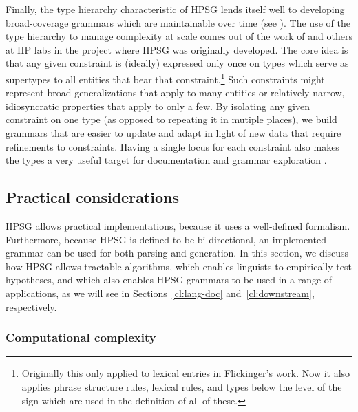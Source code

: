 \documentclass[output=paper,nonflat]{langsci/langscibook}
\begin{document}
Finally, the type hierarchy characteristic of HPSG lends itself well to developing broad-coverage grammars which are maintainable over time (see \citealt{Syg:Win:11}). The use of the type hierarchy to manage complexity at scale comes out of the work of \citet{Flickinger87} and others at HP labs in the project where HPSG was originally developed. The core idea is that any given constraint is (ideally) expressed only once on types which serve as supertypes to all entities that bear that constraint.\footnote{Originally this only applied to lexical entries in Flickinger's work. Now it also applies phrase structure rules, lexical rules, and types below the level of the sign which are used in the definition of all of these.} Such constraints might represent broad generalizations that apply to many entities or relatively narrow, idiosyncratic properties that apply to only a few. By isolating any given constraint on one type (as opposed to repeating it in mutiple places), we build grammars that are easier to update and adapt in light of new data that require refinements to constraints. Having a single locus for each constraint also makes the types a very useful target for documentation \citep{Hashimoto-etal:07} and grammar exploration \citep{Letcher:18}. 


\subsection{Practical considerations}
\label{cl:prac}

HPSG allows practical implementations,
because it uses a well-defined formalism.
Furthermore, because HPSG is defined to be bi-directional,
an implemented grammar can be used for both parsing and generation.
In this section, we discuss how HPSG allows tractable algorithms,
which enables linguists to empirically test hypotheses,
and which also enables HPSG grammars to be used in a range of applications,
as we will see in Sections~\ref{cl:lang-doc} and~\ref{cl:downstream}, respectively.

\subsubsection{Computational complexity}
\label{cl:prac:comp}
\end{document}
